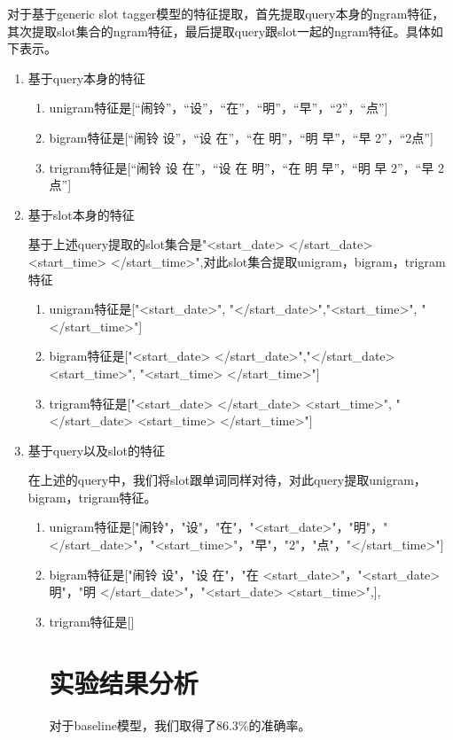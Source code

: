 \documentclass[master]{njuthesis}
\begin{document}
\begin{enumerate}
   
    对于基于generic slot tagger模型的特征提取，首先提取query本身的ngram特征，其次提取slot集合的ngram特征，最后提取query跟slot一起的ngram特征。具体如下表示。
\begin{enumerate}
  \item 基于query本身的特征
    \begin{enumerate}
      \item unigram特征是[“闹铃”，“设”，“在”，“明”，“早”，“2”，“点”]
      \item bigram特征是[“闹铃 设”，“设 在”，“在 明”，“明 早”，“早 2”，“2点”]
      \item trigram特征是[“闹铃 设 在”，“设 在 明”，“在 明 早”，“明 早 2”，“早 2 点”]
    \end{enumerate}
  \item 基于slot本身的特征
    
   基于上述query提取的slot集合是"<start\_date> </start\_date> <start\_time> </start\_time>",对此slot集合提取unigram，bigram，trigram特征
    \begin{enumerate}
      \item unigram特征是["<start\_date>", "</start\_date>","<start\_time>", "</start\_time>"]
      \item bigram特征是["<start\_date> </start\_date>","</start\_date> <start\_time>", "<start\_time> </start\_time>"]
      \item trigram特征是["<start\_date> </start\_date> <start\_time>", "</start\_date> <start\_time> </start\_time>"]
    \end{enumerate} 
  \item 基于query以及slot的特征
   
   在上述的query中，我们将slot跟单词同样对待，对此query提取unigram，bigram，trigram特征。
   \begin{enumerate}
     \item unigram特征是["闹铃"，"设"，"在"，"<start\_date>"，"明"，"</start\_date>"，"<start\_time>"，"早"，"2"，"点"，"</start\_time>"]
     \item bigram特征是["闹铃 设"，"设 在"，"在 <start\_date>"，"<start\_date> 明"，"明 </start\_date>"，"<start\_date> <start\_time>",],
     \item trigram特征是[]

\section{实验结果分析}

    对于baseline模型，我们取得了86.3\%的准确率。
    

\end{enumerate}
\end{enumerate}
\end{enumerate}
\end{document}
